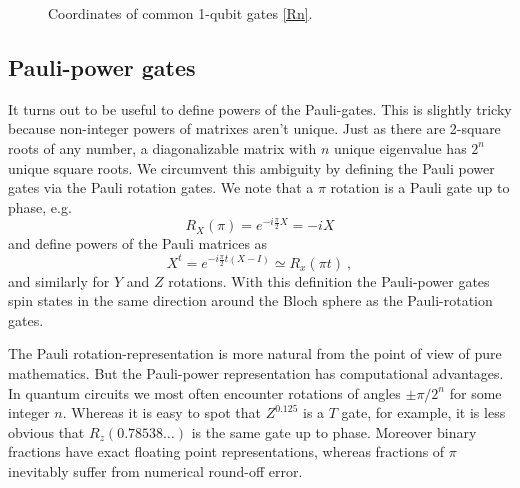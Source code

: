\begin{figure}[tp]
\begin{center}
 \end{center}

\caption[Coordinates of common 1-qubit gates.]{Coordinates of common 1-qubit gates \eqref{Rn}.}
 \label{fig:GateCoords}
\end{figure}


\subsection{Pauli-power gates}
It turns out to be useful to define powers of the Pauli-gates. This is slightly tricky because non-integer powers of matrixes aren't unique. Just as there are 2-square roots of any number, a diagonalizable matrix with $n$ unique eigenvalue has $2^n$ unique square roots. We circumvent this ambiguity by defining the Pauli power gates via the Pauli rotation gates. We note that a $\pi$ rotation is a Pauli gate up to phase, e.g.
\[
R_{X}(\pi) = e^{-i \tfrac{\pi}{2}X } = -i X 
\]
and define powers of the Pauli matrices as 
\[
X^t =e^{-i \tfrac{\pi}{2} t (X-I)} \simeq R_x(\pi t) \ ,
\]
and similarly for $Y$ and $Z$ rotations. With this definition the Pauli-power gates spin states in the same direction around the Bloch sphere as the Pauli-rotation gates.

The Pauli rotation-representation is more natural from the point of view of pure mathematics. But the Pauli-power representation has computational advantages. %
 In quantum circuits we most often encounter rotations of angles $\pm\pi /2^n$ for some integer $n$. Whereas it is easy to spot that $Z^{0.125}$ is a $T$ gate, for example, it is less obvious that $R_z(0.78538\ldots)$ is the same gate up to phase. Moreover binary fractions have exact floating point representations, whereas fractions of $\pi$ inevitably suffer from numerical round-off error.


